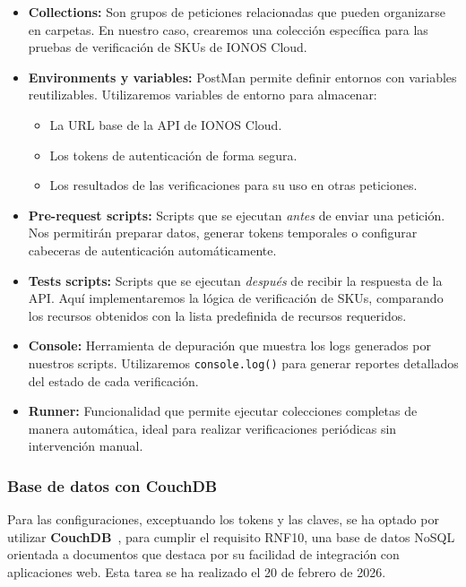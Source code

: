 \begin{itemize}
    \item \textbf{Collections:} Son grupos de peticiones relacionadas que pueden organizarse en carpetas.
          En nuestro caso, crearemos una colección específica para las pruebas de verificación de SKUs de
          IONOS Cloud.

    \item \textbf{Environments y variables:} PostMan permite definir entornos con variables reutilizables.
          Utilizaremos variables de entorno para almacenar:
          \begin{itemize}
              \item La URL base de la API de IONOS Cloud.
              \item Los tokens de autenticación de forma segura.
              \item Los resultados de las verificaciones para su uso en otras peticiones.
          \end{itemize}

    \item \textbf{Pre-request scripts:} Scripts que se ejecutan \textit{antes} de enviar una petición.
          Nos permitirán preparar datos, generar tokens temporales o configurar cabeceras de autenticación
          automáticamente.

    \item \textbf{Tests scripts:} Scripts que se ejecutan \textit{después} de recibir la respuesta de la API.
          Aquí implementaremos la lógica de verificación de SKUs, comparando los recursos obtenidos con
          la lista predefinida de recursos requeridos.

    \item \textbf{Console:} Herramienta de depuración que muestra los logs generados por nuestros scripts.
          Utilizaremos \texttt{console.log()} para generar reportes detallados del estado de cada verificación.

    \item \textbf{Runner:} Funcionalidad que permite ejecutar colecciones completas de manera automática,
          ideal para realizar verificaciones periódicas sin intervención manual.
\end{itemize}

\subsubsection{Base de datos con CouchDB}
Para las configuraciones, exceptuando los tokens y las claves, se ha optado por utilizar \textbf{CouchDB}~\Cite{CouchDB-Info}, para cumplir el requisito RNF10, una base de datos NoSQL
orientada a documentos que destaca por su facilidad de integración con aplicaciones web. Esta tarea se ha realizado el 20 de febrero de 2026.

